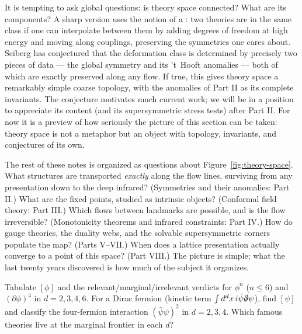 \begin{reemark}
\label{rem:deformation-class}
It is tempting to ask global questions: is theory space connected? What are its
components? A sharp version uses the notion of a : two
theories are in the same class if one can interpolate between them by adding
degrees of freedom at high energy and moving along couplings, preserving the
symmetries one cares about. Seiberg has conjectured that the deformation class
is determined by precisely two pieces of data --- the global symmetry and its
't~Hooft anomalies --- both of which are exactly preserved along any flow. If
true, this gives theory space a remarkably simple coarse topology, with the
anomalies of Part II as its complete invariants. The conjecture motivates much
current work; we will be in a position to appreciate its content (and its
supersymmetric stress tests) after Part II. For now it is a preview of how
seriously the picture of this section can be taken: theory space is not a
metaphor but an object with topology, invariants, and conjectures of its own.
\end{reemark}

The rest of these notes is organized as questions about
Figure~\ref{fig:theory-space}. What structures are transported \emph{exactly}
along the flow lines, surviving from any presentation down to the deep infrared?
(Symmetries and their anomalies: Part II.) What are the fixed points, studied as
intrinsic objects? (Conformal field theory: Part III.) Which flows between
landmarks are possible, and is the flow irreversible? (Monotonicity theorems and
infrared constraints: Part IV.) How do gauge theories, the duality webs, and
the solvable supersymmetric corners populate the map? (Parts V--VII.)
When does a lattice presentation actually converge to a point of this space?
(Part VIII.) The picture is simple; what the last twenty years discovered is
how much of the subject it organizes.

\begin{exercise}[easy]
\label{exr:power-counting}
Tabulate $[\phi]$ and the relevant/marginal/irrelevant verdicts for $\phi^n$ ($n
\le 6$) and $(\partial\phi)^4$ in $d = 2, 3, 4, 6$. For a Dirac fermion (kinetic
term $\int d^dx\, i\bar\psi \slashed{\partial} \psi$), find $[\psi]$ and
classify the four-fermion interaction $(\bar\psi\psi)^2$ in $d = 2, 3, 4$. Which
famous theories live at the marginal frontier in each $d$?
\end{exercise}

